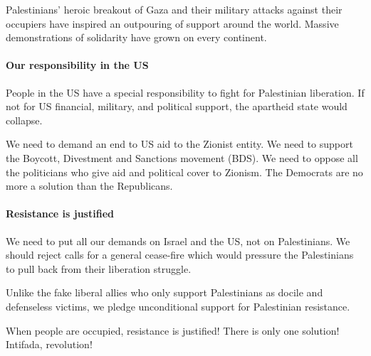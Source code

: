 Palestinians' heroic breakout of Gaza and their military attacks against their occupiers have inspired an outpouring of support around the world. Massive demonstrations of solidarity have grown on every continent.

\paragraph{Our responsibility in the US}

People in the US have a special responsibility to fight for Palestinian liberation. If not for US financial, military, and political support, the apartheid state would collapse.

We need to demand an end to US aid to the Zionist entity. We need to support the Boycott, Divestment and Sanctions movement (BDS). We need to oppose all the politicians who give aid and political cover to Zionism. The Democrats are no more a solution than the Republicans.

\paragraph{Resistance is justified}

We need to put all our demands on Israel and the US, not on Palestinians. We should reject calls for a general cease-fire which would pressure the Palestinians to pull back from their liberation struggle.

Unlike the fake liberal allies who only support Palestinians as docile and defenseless victims, we pledge unconditional support for Palestinian resistance.

When people are occupied, resistance is justified! There is only one solution! Intifada, revolution!
